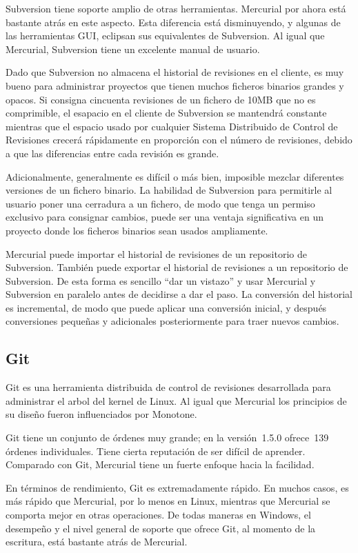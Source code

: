 Subversion tiene soporte amplio de otras herramientas. Mercurial por
ahora está bastante atrás en este aspecto.  Esta diferencia está
disminuyendo, y algunas de las herramientas GUI, eclipsan sus equivalentes de Subversion. Al igual
que Mercurial, Subversion tiene un excelente manual de usuario.

Dado que Subversion no almacena el historial de revisiones en el
cliente, es muy bueno para administrar proyectos que tienen muchos
ficheros binarios grandes y opacos. Si consigna cincuenta revisiones
de un fichero de 10MB que no es comprimible, el esapacio en el cliente
de Subversion se mantendrá constante mientras que el espacio usado por
cualquier Sistema Distribuido de Control de Revisiones crecerá
rápidamente en proporción con el número de revisiones, debido a que
las diferencias entre cada revisión es grande.

Adicionalmente, generalmente es difícil o más bien, imposible mezclar
diferentes versiones de un fichero binario. La habilidad de Subversion
para permitirle al usuario poner una cerradura  a un fichero, de modo
que tenga un permiso exclusivo para consignar cambios, puede ser una
ventaja significativa en un proyecto donde los ficheros binarios sean
usados ampliamente.

Mercurial puede importar el historial de revisiones de un repositorio
de Subversion. También puede exportar el historial de revisiones a un
repositorio de Subversion.  De esta forma es sencillo ``dar un
vistazo'' y usar Mercurial y Subversion en paralelo antes de decidirse
a dar el paso. La conversión del historial es incremental, de modo
que puede aplicar una conversión inicial, y después conversiones
pequeñas y adicionales posteriormente para traer nuevos cambios.

\subsection{Git}

Git es una herramienta distribuida de control de revisiones
desarrollada para administrar el arbol del kernel de Linux.  Al igual
que Mercurial los principios de su diseño fueron influenciados por 
Monotone.

Git tiene un conjunto de órdenes muy grande; en la versión~1.5.0
ofrece~139 órdenes individuales.  Tiene cierta reputación de ser
difícil de aprender. Comparado con Git, Mercurial tiene un fuerte
enfoque hacia la facilidad.

En términos de rendimiento, Git es extremadamente rápido. En muchos
casos, es más rápido que Mercurial, por lo menos en Linux, mientras
que Mercurial se comporta mejor en otras operaciones.  De todas
maneras en Windows, el desempeño y el nivel general de soporte que
ofrece Git, al momento de la escritura, está bastante atrás de
Mercurial.

